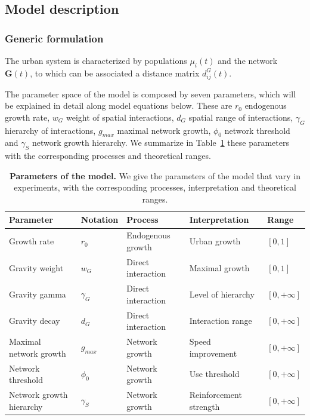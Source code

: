 \documentclass[11pt]{article}
\begin{document}
\subsection{Model description}


\subsubsection{Generic formulation}

The urban system is characterized by populations $\mu_i(t)$ and the network $\mathbf{G}(t)$, to which can be associated a distance matrix $d^G_{ij}(t)$.


The parameter space of the model is composed by seven parameters, which will be explained in detail along model equations below. These are $r_0$ endogenous growth rate, $w_G$ weight of spatial interactions, $d_G$ spatial range of interactions, $\gamma_G$ hierarchy of interactions, $g_{max}$ maximal network growth, $\phi_0$ network threshold and $\gamma_S$ network growth hierarchy. We summarize in Table~\ref{tab:parameters} these parameters with the corresponding processes and theoretical ranges.


\begin{table}
\caption{\textbf{Parameters of the model.} We give the parameters of the model that vary in experiments, with the corresponding processes, interpretation and theoretical ranges.\label{tab:parameters}}	
\begin{tabular}{|l|l|l|l|l|}
\hline
Parameter & Notation & Process & Interpretation & Range\\
\hline
Growth rate & $r_0$ & Endogenous growth & Urban growth & $\left[ 0,1\right]$ \\
Gravity weight & $w_G$ & Direct interaction & Maximal growth & $\left[ 0,1\right]$ \\
Gravity gamma & $\gamma_G$ & Direct interaction & Level of hierarchy & $\left[ 0,+\infty\right]$ \\
Gravity decay & $d_G$ & Direct interaction & Interaction range & $\left[ 0,+\infty\right]$ \\
Maximal network growth & $g_{max}$ & Network growth & Speed improvement & $\left[ 0,+\infty\right]$ \\
Network threshold & $\phi_0$ & Network growth & Use threshold & $\left[ 0,+\infty\right]$ \\
Network growth hierarchy & $\gamma_S$ & Network growth & Reinforcement strength & $\left[ 0,+\infty\right]$ \\
\hline
\end{tabular}
\end{table}
\end{document}
